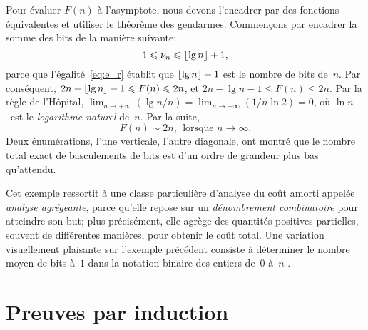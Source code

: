 Pour évaluer \(F(n)\) à l'asymptote, nous devons l'encadrer par des
fonctions équivalentes et utiliser le théorème des
gendarmes. Commençons par encadrer la somme des bits de la manière
suivante:
\begin{equation*}
1 \leqslant \nu_{n} \leqslant \lfloor{\lg n}\rfloor + 1,
\end{equation*}
parce que l'égalité~\eqref{eq:e_r} établit que \(\lfloor{\lg n}\rfloor + 1\)
est le nombre de bits de~\(n\). Par conséquent, \(2n - \lfloor{\lg n}\rfloor -
1 \leqslant F(n) \leqslant 2n\), et \(2n - \lg n - 1 \leqslant F(n)
\leqslant 2n\). Par la règle de l'Hôpital, \(\lim_{n \rightarrow
  +\infty}{(\lg n/n)} = \lim_{n \rightarrow +\infty}(1/n\ln 2) = 0\),
où \(\ln n\)~est le \emph{logarithme naturel} de~\(n\). Par la suite,
\begin{equation*}
F(n) \sim 2n,\;\, \text{lorsque \(n \rightarrow \infty\)}.
\end{equation*}
Deux énumérations, l'une verticale, l'autre diagonale, ont montré que
le nombre total exact de basculements de bits est d'un ordre de
grandeur plus bas qu'attendu.

Cet exemple ressortit à une classe particulière d'analyse du coût
amorti appelée \emph{analyse agrégeante}, parce qu'elle repose sur un
\emph{dénombrement combinatoire}
\citep{Stanley_1999a,Stanley_1999b,Martin_2001} pour atteindre son but;
plus précisément, elle agrège des quantités positives partielles,
souvent de différentes manières, pour obtenir le coût total. Une
variation visuellement plaisante sur l'exemple précédent consiste à
déterminer le nombre moyen de bits à~\(1\) dans la notation binaire
des entiers de~\(0\) à~\(n\) \citep{Bush_1940}.

\section{Preuves par induction}

